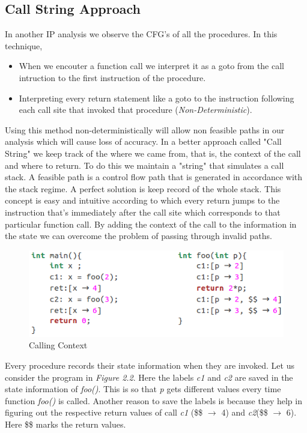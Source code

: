 \documentclass[12pt,oneside]{book}
\begin{document}
\subsection {Call String Approach}
In another IP analysis we observe the CFG's of all the procedures. In this technique,
\begin{itemize}
\item When we encouter a function call we interpret it as a goto from the call intruction to the first instruction of the procedure.
\item Interpreting every return statement like a goto to the instruction following each call site that invoked that procedure (\textit{Non-Deterministic}).
\end{itemize}
Using this method non-deterministically will allow non feasible paths in our analysis which will cause loss of accuracy. In a better approach called "Call String"\cite{callstring} we keep track of the where we came from, that is, the context of the call and where to return. To do this we maintain a "string" that simulates a call stack. A feasible path is a control flow path that is generated in accordance with the stack regime. A perfect solution is keep record of the whole stack. This concept is easy and intuitive according to which every return jumps to the instruction that's immediately after the call site which corresponds to that particular function call. By adding the context of the call to the information in the state we can overcome the problem of passing through invalid paths.\\

\begin{figure}[htbp]
\centering
\includegraphics[scale=0.6]{callString.png}
\caption{Calling Context}
\end{figure}  
 
Every procedure records their state information when they are invoked. Let us consider the program in \textit{Figure 2.2}. Here the labels \textit{c1} and \textit{c2} are saved in the state information of \textit{foo()}. This is so that \textit{p} gets different values every time function \textit{foo()} is called. Another reason to save the labels is because they help in figuring out the respective return values of call \textit{c1} (\$\$ $\rightarrow$ 4) and \textit{c2}(\$\$ $\rightarrow$ 6). Here \$\$ marks the return values.
\end{document}
